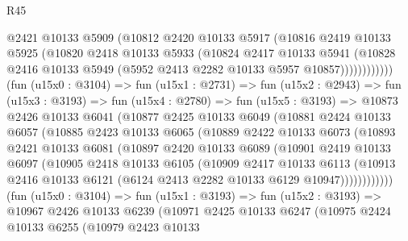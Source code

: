 \begin{lexlean}{R45}
\begin{coremodule}
                    @2421
                    @10133
                    @5909
                    (@10812
                      @2420
                      @10133
                      @5917
                      (@10816
                        @2419
                        @10133
                        @5925
                        (@10820
                          @2418
                          @10133
                          @5933
                          (@10824
                            @2417
                            @10133
                            @5941
                            (@10828
                              @2416
                              @10133
                              @5949
                              (@5952 @2413 @2282 @10133 @5957 @10857))))))))))))
        (fun (u15x0 : @3104) =>
        fun (u15x1 : @2731) =>
        fun (u15x2 : @2943) =>
        fun (u15x3 : @3193) =>
        fun (u15x4 : @2780) =>
        fun (u15x5 : @3193) =>
        @10873
          @2426
          @10133
          @6041
          (@10877
            @2425
            @10133
            @6049
            (@10881
              @2424
              @10133
              @6057
              (@10885
                @2423
                @10133
                @6065
                (@10889
                  @2422
                  @10133
                  @6073
                  (@10893
                    @2421
                    @10133
                    @6081
                    (@10897
                      @2420
                      @10133
                      @6089
                      (@10901
                        @2419
                        @10133
                        @6097
                        (@10905
                          @2418
                          @10133
                          @6105
                          (@10909
                            @2417
                            @10133
                            @6113
                            (@10913
                              @2416
                              @10133
                              @6121
                              (@6124 @2413 @2282 @10133 @6129 @10947))))))))))))
        (fun (u15x0 : @3104) =>
        fun (u15x1 : @3193) =>
        fun (u15x2 : @3193) =>
        @10967
          @2426
          @10133
          @6239
          (@10971
            @2425
            @10133
            @6247
            (@10975
              @2424
              @10133
              @6255
              (@10979
                @2423
                @10133

\end{coremodule}
\end{lexlean}
